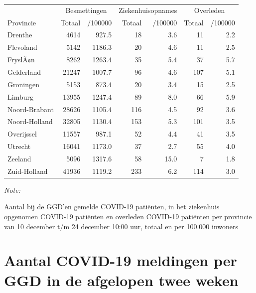 \documentclass[
  english,
  man,floatsintext]{apa6}
\begin{document}
\begin{table}
\centering
\begin{threeparttable}
\begin{tabular}{lrrrrrr}
\toprule
\multicolumn{1}{c}{ } & \multicolumn{2}{c}{Besmettingen} & \multicolumn{2}{c}{Ziekenhuisopnames} & \multicolumn{2}{c}{Overleden} \\
\cmidrule(l{3pt}r{3pt}){2-3} \cmidrule(l{3pt}r{3pt}){4-5} \cmidrule(l{3pt}r{3pt}){6-7}
Provincie & Totaal & /100000 & Totaal & /100000 & Totaal & /100000\\
\midrule
Drenthe & 4614 & 927.5 & 18 & 3.6 & 11 & 2.2\\
Flevoland & 5142 & 1186.3 & 20 & 4.6 & 11 & 2.5\\
FryslÃ¢n & 8262 & 1263.4 & 35 & 5.4 & 37 & 5.7\\
Gelderland & 21247 & 1007.7 & 96 & 4.6 & 107 & 5.1\\
Groningen & 5153 & 873.4 & 20 & 3.4 & 15 & 2.5\\
Limburg & 13955 & 1247.4 & 89 & 8.0 & 66 & 5.9\\
Noord-Brabant & 28626 & 1105.4 & 116 & 4.5 & 92 & 3.6\\
Noord-Holland & 32805 & 1130.4 & 153 & 5.3 & 101 & 3.5\\
Overijssel & 11557 & 987.1 & 52 & 4.4 & 41 & 3.5\\
Utrecht & 16041 & 1173.0 & 37 & 2.7 & 55 & 4.0\\
Zeeland & 5096 & 1317.6 & 58 & 15.0 & 7 & 1.8\\
Zuid-Holland & 41936 & 1119.2 & 233 & 6.2 & 114 & 3.0\\
\bottomrule
\end{tabular}
\begin{tablenotes}
\item \textit{Note: } 
\item Aantal bij de GGD’en gemelde COVID-19 patiënten, in het ziekenhuis opgenomen COVID-19 patiënten en overleden COVID-19 patiënten per provincie van 10 december t/m 24 december 10:00 uur, totaal en per 100.000 inwoners
\end{tablenotes}
\end{threeparttable}
\end{table}

\newpage

\hypertarget{aantal-covid-19-meldingen-per-ggd-in-de-afgelopen-twee-weken}{%
\section{Aantal COVID-19 meldingen per GGD in de afgelopen twee weken}\label{aantal-covid-19-meldingen-per-ggd-in-de-afgelopen-twee-weken}}
\end{document}
